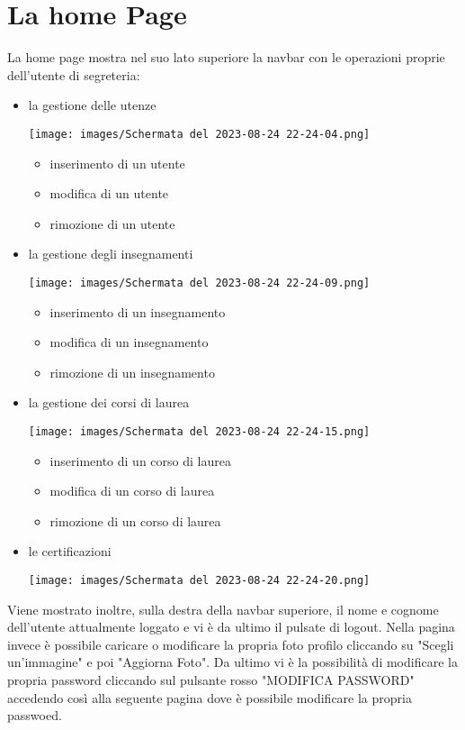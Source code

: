 \documentclass{article}
\begin{document}
    \section{La home Page}
    La home page mostra nel suo lato superiore la navbar con le operazioni proprie dell'utente di segreteria:
    \begin{itemize}
        \item la gestione delle utenze

        \texttt{[image: images/Schermata del 2023-08-24 22-24-04.png]}

        \begin{itemize}
            \item inserimento di un utente
            \item modifica di un utente
            \item rimozione di un utente
        \end{itemize}

        \pagebreak
        \item la gestione degli insegnamenti

        \texttt{[image: images/Schermata del 2023-08-24 22-24-09.png]}

        \begin{itemize}
            \item inserimento di un insegnamento
            \item modifica di un insegnamento
            \item rimozione di un insegnamento
        \end{itemize}
        \item la gestione dei corsi di laurea

        \texttt{[image: images/Schermata del 2023-08-24 22-24-15.png]}

        \begin{itemize}
            \item inserimento di un corso di laurea
            \item modifica di un corso di laurea
            \item rimozione di un corso di laurea
        \end{itemize}

        \pagebreak

        \item le certificazioni

        \texttt{[image: images/Schermata del 2023-08-24 22-24-20.png]}

    \end{itemize}
    Viene mostrato inoltre, sulla destra della navbar superiore, il nome e cognome dell'utente attualmente loggato e vi è da ultimo il pulsate di logout.
    Nella pagina invece è possibile caricare o modificare la propria foto profilo cliccando su "Scegli un'immagine" e poi "Aggiorna Foto".
    Da ultimo vi è la possibilità di modificare la propria password cliccando sul pulsante rosso "MODIFICA PASSWORD" accedendo così alla seguente pagina dove è possibile modificare la propria passwoed.
\end{document}
